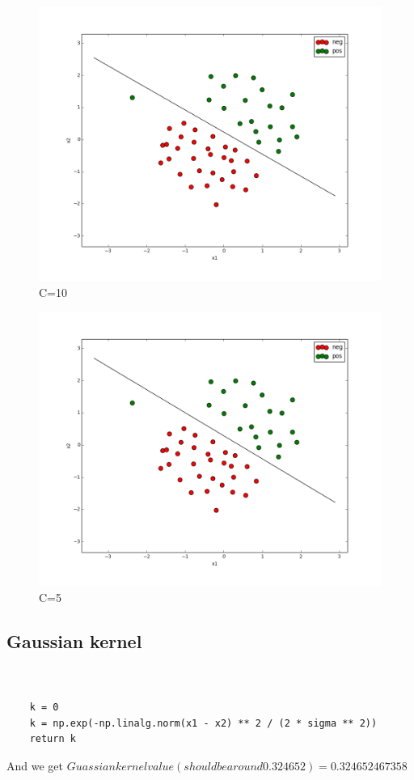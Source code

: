 \documentclass[pdftex,11pt]{article}
\begin{document}
\begin{figure}[H]
  \caption{C=10}
  \centering
    \includegraphics[scale=0.5]{c10.png}
\end{figure}

\begin{figure}[H]
  \caption{C=5}
  \centering
    \includegraphics[scale=0.5]{c5.png}
\end{figure}





\subsection{Gaussian kernel}
\begin{lstlisting}


    k = 0
    k = np.exp(-np.linalg.norm(x1 - x2) ** 2 / (2 * sigma ** 2))
    return k
\end{lstlisting}
 And we get $Guassian kernel value (should be around 0.324652) =  0.324652467358$
 
\end{document}
